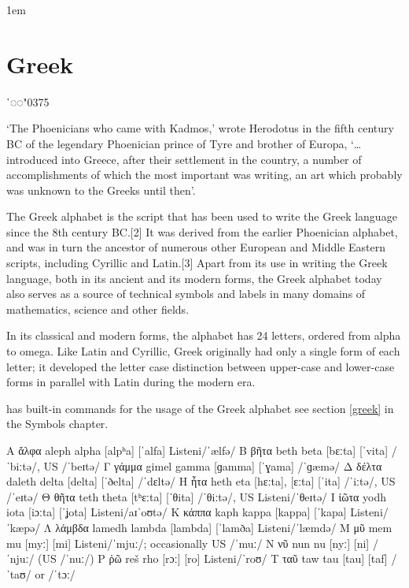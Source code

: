 \def\diacritic#1{{#1\LARGE ῾◌◌\char"0375}}

\parindent1em

\section{Greek}
\newfontfamily{}

\def\greektext#1{\greek{#1}}

\diacritic{\greek}

`The Phoenicians who came with Kadmos,' wrote Herodotus in the fifth century BC of the legendary Phoenician prince of Tyre and brother of Europa, `\ldots introduced into Greece, after their settlement in the country, a number of accomplishments of which the most important was writing, an art which probably was unknown to the Greeks until then'. 

The Greek alphabet is the script that has been used to write the Greek language since the 8th century BC.[2] It was derived from the earlier Phoenician alphabet, and was in turn the ancestor of numerous other European and Middle Eastern scripts, including Cyrillic and Latin.[3] Apart from its use in writing the Greek language, both in its ancient and its modern forms, the Greek alphabet today also serves as a source of technical symbols and labels in many domains of mathematics, science and other fields.

In its classical and modern forms, the alphabet has 24 letters, ordered from alpha to omega. Like Latin and Cyrillic, Greek originally had only a single form of each letter; it developed the letter case distinction between upper-case and lower-case forms in parallel with Latin during the modern era.

\tex has built-in commands for the usage of the Greek alphabet see section \ref{greek} in the Symbols chapter.

\bgroup
\greek\obeyspaces

Α	ἄλφα	aleph	alpha	[alpʰa]	[ˈalfa]	Listeni/ˈælfə/
Β	βῆτα	beth	beta	[bɛːta]	[ˈvita]	/ˈbiːtə/, US /ˈbeɪtə/
Γ	γάμμα	gimel	gamma	[ɡamma]	[ˈɣama]	/ˈɡæmə/
Δ	δέλτα	daleth	delta	[delta]	[ˈðelta]	/ˈdɛltə/
Η	ἦτα	  heth	   eta	 [hɛːta], [ɛːta]	[ˈita]	/ˈiːtə/, US /ˈeɪtə/
Θ	θῆτα	teth	theta	[tʰɛːta]	[ˈθita]	/ˈθiːtə/, US Listeni/ˈθeɪtə/
Ι	ἰῶτα	yodh	iota	[iɔːta]	[ˈʝota]	Listeni/aɪˈoʊtə/
Κ	κάππα	kaph	kappa	[kappa]	[ˈkapa]	Listeni/ˈkæpə/
Λ	λάμβδα	lamedh	lambda	[lambda]	[ˈlamða]	Listeni/ˈlæmdə/
Μ	μῦ	mem	mu	[myː]	[mi]	Listeni/ˈmjuː/; occasionally US /ˈmuː/
Ν	νῦ	nun	nu	[nyː]	[ni]	/ˈnjuː/ (US /ˈnuː/)
Ρ	ῥῶ	reš	rho	[rɔː]	[ro]	Listeni/ˈroʊ/
Τ	ταῦ	taw	tau	[tau]	[taf]	/ˈtaʊ/ or /ˈtɔː/

